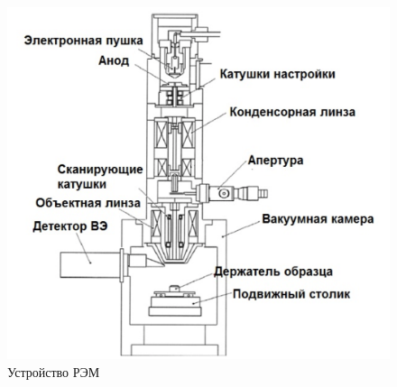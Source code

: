 \documentclass[a4paper]{article}
\begin{document}
\begin{figure}[H]
    \centering
    \includegraphics[scale = 0.3]{setup.png}
    \caption{Устройство РЭМ}
    \label{setup}
\end{figure}
\end{document}
